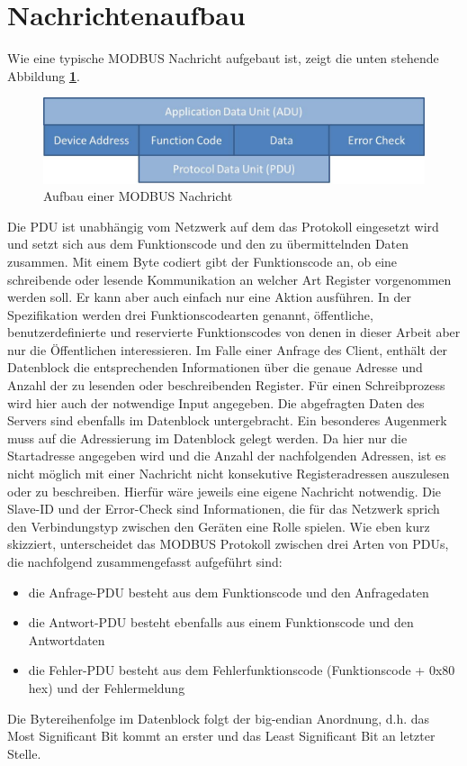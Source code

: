 \section{Nachrichtenaufbau}
Wie eine typische MODBUS Nachricht aufgebaut ist, zeigt die unten stehende Abbildung \textbf{\ref{fig:modbusmessage}}. 
\begin{figure}[h]
\centering
\includegraphics[scale=0.65]{modbus/ADUPDU}
\caption{Aufbau einer MODBUS Nachricht}
\label{fig:modbusmessage}
\end{figure} 
Die PDU ist unabhängig vom Netzwerk auf dem das Protokoll eingesetzt wird und setzt sich aus dem Funktionscode und den zu übermittelnden Daten zusammen. Mit einem Byte codiert gibt der Funktionscode an, ob eine schreibende oder lesende Kommunikation an welcher Art Register vorgenommen werden soll. Er kann aber auch einfach nur eine Aktion ausführen. In der Spezifikation werden drei Funktionscodearten genannt, öffentliche, benutzerdefinierte und reservierte Funktionscodes von denen in dieser Arbeit aber nur die Öffentlichen interessieren. Im Falle einer Anfrage des Client, enthält der Datenblock die entsprechenden Informationen über die genaue Adresse und Anzahl der zu lesenden oder beschreibenden Register. Für einen Schreibprozess wird hier auch der notwendige Input angegeben. Die abgefragten Daten des Servers sind ebenfalls im Datenblock untergebracht. Ein besonderes Augenmerk muss auf die Adressierung im Datenblock gelegt werden. Da hier nur die Startadresse angegeben wird und die Anzahl der nachfolgenden Adressen, ist es nicht möglich mit einer Nachricht nicht konsekutive Registeradressen auszulesen oder zu beschreiben. Hierfür wäre jeweils eine eigene Nachricht notwendig. Die Slave-ID und der Error-Check sind Informationen, die für das Netzwerk sprich den Verbindungstyp zwischen den Geräten eine Rolle spielen. Wie eben kurz skizziert, unterscheidet das MODBUS Protokoll zwischen drei Arten von PDUs, die nachfolgend zusammengefasst aufgeführt sind:
\begin{itemize}
\item die Anfrage-PDU besteht aus dem Funktionscode und den Anfragedaten
\item die Antwort-PDU besteht ebenfalls aus einem Funktionscode und den Antwortdaten
\item die Fehler-PDU besteht aus dem Fehlerfunktionscode (Funktionscode + 0x80 hex) und der Fehlermeldung 
\end{itemize}
Die Bytereihenfolge im Datenblock folgt der big-endian Anordnung, d.h. das Most Significant Bit kommt an erster und das Least Significant Bit an letzter Stelle. 
